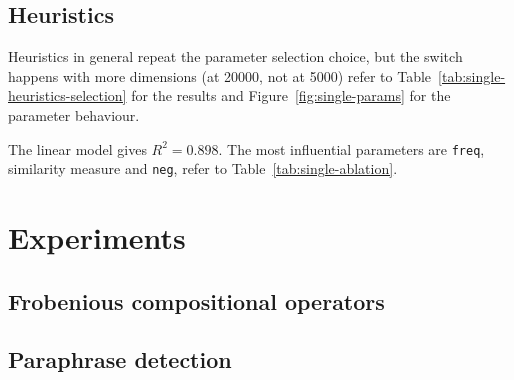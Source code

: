 
\subsection{Heuristics}
\label{sec:heuristics-single}

Heuristics in general repeat the parameter selection choice, but the switch happens with more dimensions (at 20000, not at 5000) refer to Table~\ref{tab:single-heuristics-selection} for the results and Figure~\ref{fig:single-params} for the parameter behaviour.


The linear model gives $R^2 = 0.898$. The most influential parameters are \texttt{freq}, similarity measure and \texttt{neg}, refer to Table~\ref{tab:single-ablation}.






\section{Experiments}
\label{cha:extr-exper}


\subsection{Frobenious compositional operators}
\label{sec:frob-comp-oper}

\subsection{Paraphrase detection}
\label{sec:paraphrase-detection}




